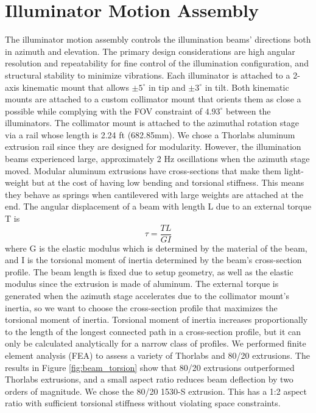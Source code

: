 \section{Illuminator Motion Assembly}
The illuminator motion assembly controls the illumination beams' directions both in azimuth and elevation. The primary design considerations are high angular resolution and repeatability for fine control of the illumination configuration, and structural stability to minimize vibrations. Each illuminator is attached to a 2-axis kinematic mount that allows $\pm 5^\circ$ in tip and  $\pm 3^\circ$ in tilt. Both kinematic mounts are attached to a custom collimator mount that orients them as close a possible while complying with the FOV constraint of $4.93^\circ$ between the illuminators. The collimator mount is attached to the azimuthal rotation stage via a rail whose length is 2.24 ft (682.85mm). We chose a Thorlabs aluminum extrusion rail since they are designed for modularity. However, the illumination beams experienced large, approximately 2 Hz oscillations when the azimuth stage moved. Modular aluminum extrusions have cross-sections that make them light-weight but at the cost of having low bending and torsional stiffness. This means they behave as springs when cantilevered with large weights are attached at the end. The angular displacement of a beam with length L due to an external torque T is
%
\begin{equation}
    \tau = \frac{TL}{GI}
\end{equation}
%
where G is the elastic modulus which is determined by the material of the beam, and I is the torsional moment of inertia determined by the beam's cross-section profile. The beam length is fixed due to setup geometry, as well as the elastic modulus since the extrusion is made of aluminum. The external torque is generated when the azimuth stage accelerates due to the collimator mount's inertia, so we want to choose the cross-section profile that maximizes the torsional moment of inertia. Torsional moment of inertia increases proportionally to the length of the longest connected path in a cross-section profile, but it can only be calculated analytically for a narrow class of profiles. We performed finite element analysis (FEA) to assess a variety of Thorlabs and 80/20 extrusions. The results in Figure \ref{fig:beam_torsion} show that 80/20 extrusions outperformed Thorlabs extrusions, and a small aspect ratio reduces beam deflection by two orders of magnitude. We chose the 80/20 1530-S extrusion. This has a 1:2 aspect ratio with sufficient torsional stiffness without violating space constraints.
